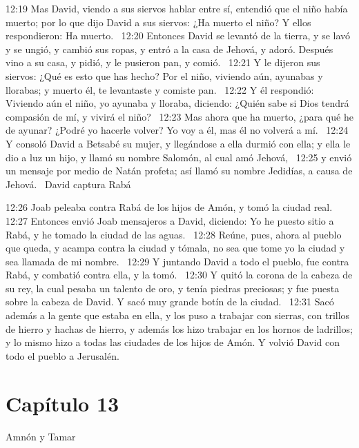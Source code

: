 12:19 Mas David, viendo a sus siervos hablar entre sí, entendió que el niño había muerto; por lo que dijo David a sus siervos: ¿Ha muerto el niño? Y ellos respondieron: Ha muerto.  
12:20 Entonces David se levantó de la tierra, y se lavó y se ungió, y cambió sus ropas, y entró a la casa de Jehová, y adoró. Después vino a su casa, y pidió, y le pusieron pan, y comió.  
12:21 Y le dijeron sus siervos: ¿Qué es esto que has hecho? Por el niño, viviendo aún, ayunabas y llorabas; y muerto él, te levantaste y comiste pan.  
12:22 Y él respondió: Viviendo aún el niño, yo ayunaba y lloraba, diciendo: ¿Quién sabe si Dios tendrá compasión de mí, y vivirá el niño?  
12:23 Mas ahora que ha muerto, ¿para qué he de ayunar? ¿Podré yo hacerle volver? Yo voy a él, mas él no volverá a mí.  
12:24 Y consoló David a Betsabé su mujer, y llegándose a ella durmió con ella; y ella le dio a luz un hijo, y llamó su nombre Salomón, al cual amó Jehová,  
12:25 y envió un mensaje por medio de Natán profeta; así llamó su nombre Jedidías, a causa de Jehová.  
David captura Rabá  

12:26 Joab peleaba contra Rabá de los hijos de Amón, y tomó la ciudad real.  
12:27 Entonces envió Joab mensajeros a David, diciendo: Yo he puesto sitio a Rabá, y he tomado la ciudad de las aguas.  
12:28 Reúne, pues, ahora al pueblo que queda, y acampa contra la ciudad y tómala, no sea que tome yo la ciudad y sea llamada de mi nombre.  
12:29 Y juntando David a todo el pueblo, fue contra Rabá, y combatió contra ella, y la tomó.  
12:30 Y quitó la corona de la cabeza de su rey, la cual pesaba un talento de oro, y tenía piedras preciosas; y fue puesta sobre la cabeza de David. Y sacó muy grande botín de la ciudad.  
12:31 Sacó además a la gente que estaba en ella, y los puso a trabajar con sierras, con trillos de hierro y hachas de hierro, y además los hizo trabajar en los hornos de ladrillos; y lo mismo hizo a todas las ciudades de los hijos de Amón. Y volvió David con todo el pueblo a Jerusalén.  
\section*{Capítulo 13 }
Amnón y Tamar  

